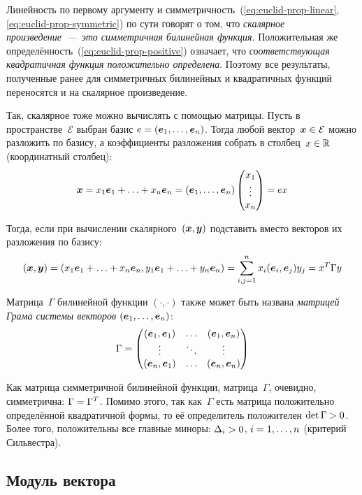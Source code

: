 \documentclass[a4paper,12pt]{article}
\begin{document}
  Линейность по первому аргументу и симметричность~(\ref{eq:euclid-prop-linear}, \ref{eq:euclid-prop-symmetric}) по сути говорят о том, что \emph{скалярное произведение~---~это симметричная билинейная функция}.
  Положительная же определённость~(\ref{eq:euclid-prop-positive}) означает, что \emph{соответствующая квадратичная функция положительно определена}.
  Поэтому все результаты, полученные ранее для симметричных билинейных и квадратичных функций переносятся и на скалярное произведение.
  
  Так, скалярное тоже можно вычислять с помощью матрицы.
  Пусть в пространстве~$\mathcal E$ выбран базис $e \hm= (\bds e_1, \ldots, \bds e_n)$.
  Тогда любой вектор~$\bds x \hm\in \mathcal E$ можно разложить по базису, а коэффициенты разложения собрать в столбец~$x \hm\in \RR$ (координатный столбец):
  \[
    \boldsymbol x = x_1 \boldsymbol e_1 + \ldots + x_n \boldsymbol e_n = (\boldsymbol e_1, \ldots, \boldsymbol e_n) \begin{pmatrix}
      x_1\\
      \vdots\\
      x_n
    \end{pmatrix} = e x
  \]
  
  Тогда, если при вычислении скалярного~$(\boldsymbol x, \boldsymbol y)$ подставить вместо векторов их разложения по базису:
  \[
    (\boldsymbol x, \boldsymbol y) = (x_1 \boldsymbol e_1 + \ldots + x_n \boldsymbol e_n, y_1 \boldsymbol e_1 + \ldots + y_n \boldsymbol e_n)
    = \sum_{i, j = 1}^n x_i (\boldsymbol e_i, \boldsymbol e_j) y_j
    = x^T \Gamma y
  \]
  
  Матрица~$\Gamma$ билинейной функции $(\cdot, \cdot)$ также может быть названа \emph{матрицей Грама системы векторов $(\boldsymbol e_1, \ldots, \boldsymbol e_n)$}:
  \[
    \Gamma = \begin{pmatrix}
      (\boldsymbol e_1, \boldsymbol e_1) & \ldots & (\boldsymbol e_1, \boldsymbol e_n)\\
      \vdots               & \ddots & \vdots\\
      (\boldsymbol e_n, \boldsymbol e_1) & \ldots & (\boldsymbol e_n, \boldsymbol e_n)
    \end{pmatrix}
  \]
  
  Как матрица симметричной билинейной функции, матрица~$\Gamma$, очевидно, симметрична: $\Gamma \hm= \Gamma^T$.
  Помимо этого, так как~$\Gamma$ есть матрица положительно определённой квадратичной формы, то её определитель положителен $\det \Gamma \hm> 0$.
  Более того, положительны все главные миноры: $\Delta_i \hm> 0$, $i \hm= 1, \ldots, n$ (критерий Сильвестра).
  
  
  \subsection{Модуль вектора}
  
\end{document}
